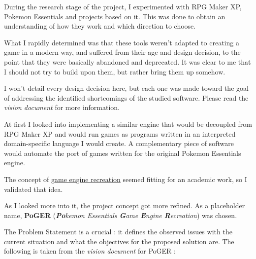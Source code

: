 \documentclass[11pt]{article}
\begin{document}
During the research stage of the project, I experimented with RPG Maker XP, Pokemon Essentials and projects based on it. This was done to obtain an understanding of how they work and which direction to choose.

What I rapidly determined was that these tools weren't adapted to creating a game in a modern way, and suffered from their age and design decision, to the point that they were basically abandoned and deprecated. It was clear to me that I should not try to build upon them, but rather bring them up somehow.

I won't detail every design decision here, but each one was made toward the goal of addressing the identified shortcomings of the studied software. Please read the \textit{vision document} for more information.

At first I looked into implementing a similar engine that would be decoupled from RPG Maker XP  and would run games as programs written in an interpreted domain-specific language I would create. A complementary piece of software would automate the port of games written for the original Pokemon Essentials engine.

The concept of \href{https://en.wikipedia.org/wiki/Game_engine_recreation}{game engine recreation} seemed fitting for an academic work, so I validated that idea. 

As I looked more into it, the project concept got more refined. As a placeholder name, \textbf{PoGER} (\textit{\textbf{Po}kemon Essentials \textbf{G}ame \textbf{E}ngine \textbf{R}ecreation}) was chosen.

The Problem Statement is a crucial : it defines the observed issues with the current situation and what the objectives for the proposed solution are. The following is taken from the \textit{vision document} for PoGER :
\end{document}
